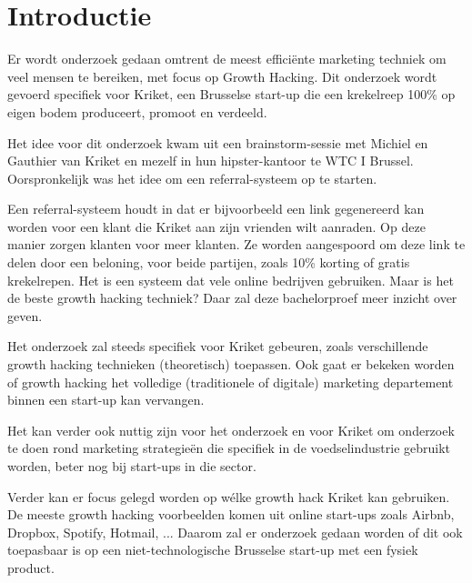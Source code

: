 
\section{Introductie} %
\label{sec:introductie}

Er wordt onderzoek gedaan omtrent de meest efficiënte marketing techniek om veel mensen te bereiken, met focus op Growth Hacking. Dit onderzoek wordt gevoerd specifiek voor Kriket, een Brusselse start-up die een krekelreep 100\% op eigen bodem produceert, promoot en verdeeld.

Het idee voor dit onderzoek kwam uit een brainstorm-sessie met Michiel en Gauthier van Kriket en mezelf in hun hipster-kantoor te WTC I Brussel. Oorspronkelijk was het idee om een referral-systeem op te starten. 

Een referral-systeem houdt in dat er bijvoorbeeld een link gegenereerd kan worden voor een klant die Kriket aan zijn vrienden wilt aanraden. Op deze manier zorgen klanten voor meer klanten. Ze worden aangespoord om deze link te delen door een beloning, voor beide partijen, zoals 10\% korting of gratis krekelrepen. Het is een systeem dat vele online bedrijven gebruiken. Maar is het de beste growth hacking techniek? Daar zal deze bachelorproef meer inzicht over geven.

Het onderzoek zal steeds specifiek voor Kriket gebeuren, zoals verschillende growth hacking technieken (theoretisch) toepassen. Ook gaat er bekeken worden of growth hacking het volledige (traditionele of digitale) marketing departement binnen een start-up kan vervangen.

Het kan verder ook nuttig zijn voor het onderzoek en voor Kriket om onderzoek te doen rond marketing strategieën die specifiek in de voedselindustrie gebruikt worden, beter nog bij start-ups in die sector.

Verder kan er focus gelegd worden op wélke growth hack Kriket kan gebruiken. De meeste growth hacking voorbeelden komen uit online start-ups zoals Airbnb, Dropbox, Spotify, Hotmail, ... Daarom zal er onderzoek gedaan worden of dit ook toepasbaar is op een niet-technologische Brusselse start-up met een fysiek product.


